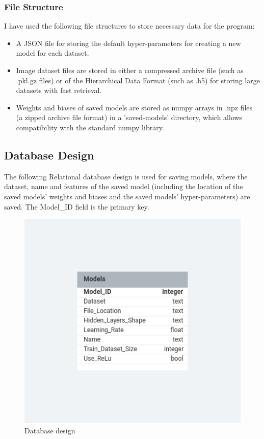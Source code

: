 \documentclass[./project-report/src/latex/project-report.tex]{subfiles}
\begin{document}
\subsubsection{File Structure}

I have used the following file structures to store necessary data for the program:

\begin{itemize}
	\item A JSON file \cite{w3json} for storing the default hyper-parameters for creating a new model for each dataset.
	\item Image dataset files are stored in either a compressed archive file (such as .pkl.gz files) or of the Hierarchical Data Format (such as .h5) for storing large 
		  datasets with fast retrieval.
	\item Weights and biases of saved models are stored as numpy arrays in .npz files (a zipped archive file format) in a 'saved-models' directory, which allows compatibility 
		  with the standard numpy library.
\end{itemize}

\pagebreak

\subsection{Database Design}

The following Relational database design is used for saving models, where the dataset, name and features of the saved model (including the location of the 
saved models' weights and biases and the saved models' hyper-parameters) are saved. The Model\_ID field is the primary key.

\begin{figure}[h!]
\centering
\includegraphics[width=1\textwidth]{./project-report/src/images/database-design.png}
\caption{Database design}
\label{fig:database-design}
\end{figure}
\end{document}

